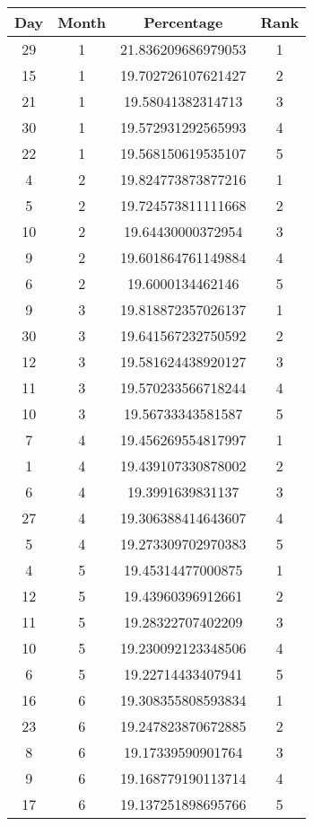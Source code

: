 \begin{tabular}{|c|c|c|c|}
\hline
Day&Month&Percentage&Rank \\ 
\hline
\hline
29&1&21.836209686979053&1 \\ 
\hline
15&1&19.702726107621427&2 \\ 
\hline
21&1&19.58041382314713&3 \\ 
\hline
30&1&19.572931292565993&4 \\ 
\hline
22&1&19.568150619535107&5 \\ 
\hline
4&2&19.824773873877216&1 \\ 
\hline
5&2&19.724573811111668&2 \\ 
\hline
10&2&19.64430000372954&3 \\ 
\hline
9&2&19.601864761149884&4 \\ 
\hline
6&2&19.6000134462146&5 \\ 
\hline
9&3&19.818872357026137&1 \\ 
\hline
30&3&19.641567232750592&2 \\ 
\hline
12&3&19.581624438920127&3 \\ 
\hline
11&3&19.570233566718244&4 \\ 
\hline
10&3&19.56733343581587&5 \\ 
\hline
7&4&19.456269554817997&1 \\ 
\hline
1&4&19.439107330878002&2 \\ 
\hline
6&4&19.3991639831137&3 \\ 
\hline
27&4&19.306388414643607&4 \\ 
\hline
5&4&19.273309702970383&5 \\ 
\hline
4&5&19.45314477000875&1 \\ 
\hline
12&5&19.43960396912661&2 \\ 
\hline
11&5&19.28322707402209&3 \\ 
\hline
10&5&19.230092123348506&4 \\ 
\hline
6&5&19.22714433407941&5 \\ 
\hline
16&6&19.308355808593834&1 \\ 
\hline
23&6&19.247823870672885&2 \\ 
\hline
8&6&19.17339590901764&3 \\ 
\hline
9&6&19.168779190113714&4 \\ 
\hline
17&6&19.137251898695766&5 \\ 
\hline
\end{tabular}